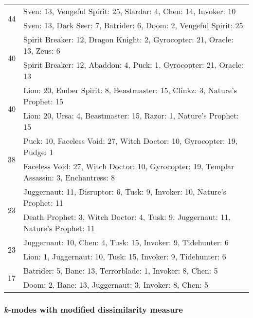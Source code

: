 \documentclass[result.tex]{subfiles}
\begin{document}
\begin{table}[H]
\begin{tabular}{ | c | p{12.5cm} | }
    \hline
    \multirow{2}{*}{44}
    & Sven: 13, Vengeful Spirit: 25, Slardar: 4, Chen: 14, Invoker: 10 \\
    & Sven: 13, Dark Seer: 7, Batrider: 6, Doom: 2, Vengeful Spirit: 25 \\
    \hline
    \multirow{2}{*}{40}
    & Spirit Breaker: 12, Dragon Knight: 2, Gyrocopter: 21, Oracle: 13, Zeus: 6 \\
    & Spirit Breaker: 12, Abaddon: 4, Puck: 1, Gyrocopter: 21, Oracle: 13 \\
    \hline
    \multirow{2}{*}{40}
    & Lion: 20, Ember Spirit: 8, Beastmaster: 15, Clinkz: 3, Nature's Prophet: 15 \\
    & Lion: 20, Ursa: 4, Beastmaster: 15, Razor: 1, Nature's Prophet: 15 \\
    \hline
    \multirow{2}{*}{38}
    & Puck: 10, Faceless Void: 27, Witch Doctor: 10, Gyrocopter: 19, Pudge: 1 \\
    & Faceless Void: 27, Witch Doctor: 10, Gyrocopter: 19, Templar Assassin: 3, Enchantress: 8 \\
    \hline
    \multirow{2}{*}{23}
    & Juggernaut: 11, Disruptor: 6, Tusk: 9, Invoker: 10, Nature's Prophet: 11 \\
    & Death Prophet: 3, Witch Doctor: 4, Tusk: 9, Juggernaut: 11, Nature's Prophet: 11 \\
    \hline
    \multirow{2}{*}{23}
    & Juggernaut: 10, Chen: 4, Tusk: 15, Invoker: 9, Tidehunter: 6 \\
    & Lion: 1, Juggernaut: 10, Tusk: 15, Invoker: 9, Tidehunter: 6 \\
    \hline
    \multirow{2}{*}{17}
    & Batrider: 5, Bane: 13, Terrorblade: 1, Invoker: 8, Chen: 5 \\
    & Doom: 2, Bane: 13, Juggernaut: 3, Invoker: 8, Chen: 5 \\
    \hline
  \end{tabular}
  \caption{}
  \label{}
\end{table}

\newpage

\subsubsection*{\textit{k}-modes with modified dissimilarity measure}
\end{document}
